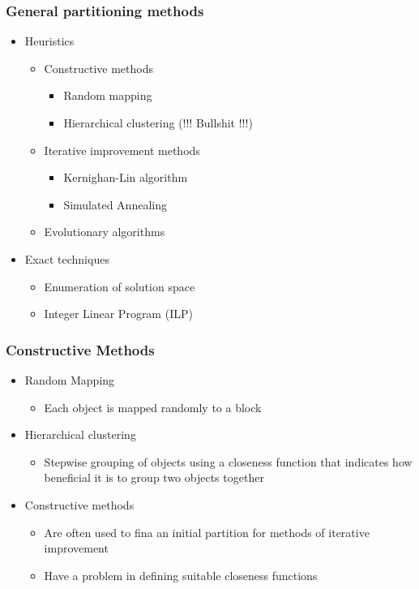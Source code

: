 \subsubsection{General partitioning methods}
\begin{itemize}
	\item Heuristics
\begin{itemize}
	\item Constructive methods
\begin{itemize}
	\item Random mapping
	\item Hierarchical clustering (!!! Bullshit !!!)
\end{itemize}
	\item Iterative improvement methods
\begin{itemize}
	\item Kernighan-Lin algorithm
	\item Simulated Annealing
\end{itemize}
	\item Evolutionary algorithms
\end{itemize}
	\item Exact techniques
\begin{itemize}
	\item Enumeration of solution space
	\item Integer Linear Program (ILP)
\end{itemize}
\end{itemize}

\subsubsection{Constructive Methods}
\begin{itemize}
	\item Random Mapping
\begin{itemize}
	\item Each object is mapped randomly to a block
\end{itemize}
	\item Hierarchical clustering
\begin{itemize}
	\item Stepwise grouping of objects using a closeness function that indicates how beneficial it is to group two objects together
\end{itemize}
	\item Constructive methods
\begin{itemize}
	\item Are often used to fina an initial partition for methods of iterative improvement
	\item Have a problem in defining suitable closeness functions
\end{itemize}
\end{itemize}

